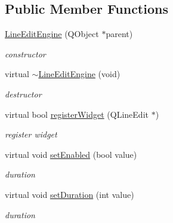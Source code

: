 \subsection*{Public Member Functions}
\begin{DoxyCompactItemize}
\item 
\mbox{\label{class_line_edit_engine_ac1360bc07602fa9e32633f5c8e0e5df0}} 
\hyperlink{class_line_edit_engine_ac1360bc07602fa9e32633f5c8e0e5df0}{Line\+Edit\+Engine} (Q\+Object $\ast$parent)
\begin{DoxyCompactList}\small\item\em constructor \end{DoxyCompactList}\item 
\mbox{\label{class_line_edit_engine_a91baeca40d9754d10e09e294be9b0edc}} 
virtual \hyperlink{class_line_edit_engine_a91baeca40d9754d10e09e294be9b0edc}{$\sim$\+Line\+Edit\+Engine} (void)
\begin{DoxyCompactList}\small\item\em destructor \end{DoxyCompactList}\item 
\mbox{\label{class_line_edit_engine_aec94d31907fd2577614204ec5bb94fde}} 
virtual bool \hyperlink{class_line_edit_engine_aec94d31907fd2577614204ec5bb94fde}{register\+Widget} (Q\+Line\+Edit $\ast$)
\begin{DoxyCompactList}\small\item\em register widget \end{DoxyCompactList}\item 
\mbox{\label{class_line_edit_engine_a430031f6737e00edf31f251434a04297}} 
virtual void \hyperlink{class_line_edit_engine_a430031f6737e00edf31f251434a04297}{set\+Enabled} (bool value)
\begin{DoxyCompactList}\small\item\em duration \end{DoxyCompactList}\item 
\mbox{\label{class_line_edit_engine_a1d90a90d86f3368e8211aa1a11893984}} 
virtual void \hyperlink{class_line_edit_engine_a1d90a90d86f3368e8211aa1a11893984}{set\+Duration} (int value)
\begin{DoxyCompactList}\small\item\em duration \end{DoxyCompactList}\end{DoxyCompactItemize}
